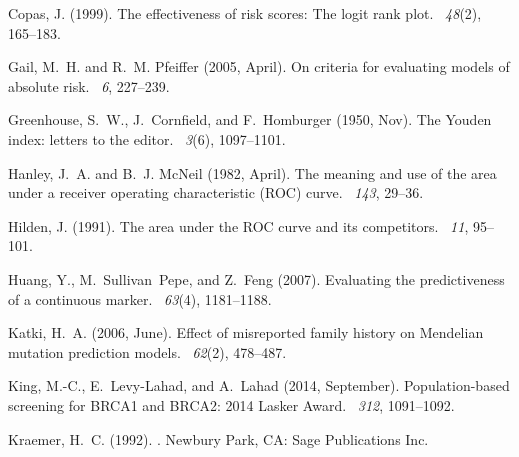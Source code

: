 \documentclass[11pt, letterpaper]{article}
\begin{document}
\begin{thebibliography}{}
	Copas, J. (1999).
	\newblock The effectiveness of risk scores: The logit rank plot.
	~{\em 48\/}(2), 165--183.
	
	Gail, M.~H. and R.~M. Pfeiffer (2005, April).
	\newblock On criteria for evaluating models of absolute risk.
	~{\em 6}, 227--239.
	
	Greenhouse, S.~W., J.~Cornfield, and F.~Homburger (1950, Nov).
	\newblock The {Y}ouden index: letters to the editor.
	~{\em 3\/}(6), 1097--1101.
	
	Hanley, J.~A. and B.~J. McNeil (1982, April).
	\newblock The meaning and use of the area under a receiver operating
	characteristic ({ROC}) curve.
	~{\em 143}, 29--36.
	
	Hilden, J. (1991).
	\newblock The area under the {ROC} curve and its competitors.
	~{\em 11}, 95--101.
	
	Huang, Y., M.~Sullivan~Pepe, and Z.~Feng (2007).
	\newblock Evaluating the predictiveness of a continuous marker.
	~{\em 63\/}(4), 1181--1188.
	
	Katki, H.~A. (2006, June).
	\newblock Effect of misreported family history on {M}endelian mutation
	prediction models.
	~{\em 62\/}(2), 478--487.
	
	King, M.-C., E.~Levy-Lahad, and A.~Lahad (2014, September).
	\newblock Population-based screening for {BRCA1} and {BRCA2}: 2014 {L}asker
	{A}ward.
	~{\em 312}, 1091--1092.
	
	Kraemer, H.~C. (1992).
	.
	\newblock Newbury Park, {CA}: Sage Publications Inc.
	

\end{thebibliography}
\end{document}
